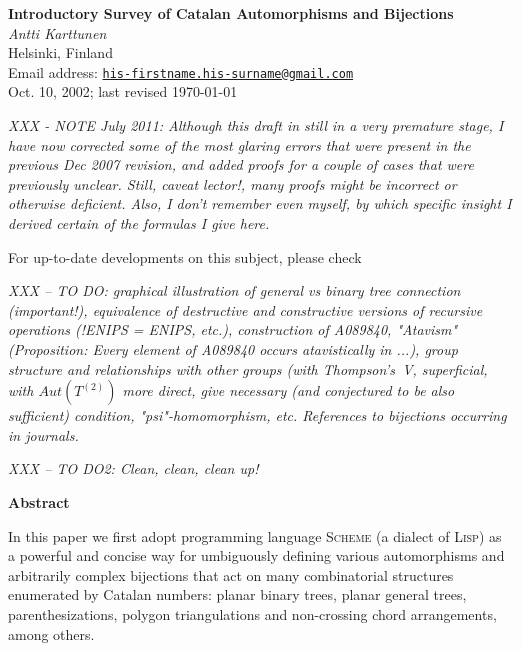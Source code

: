 \documentclass[11pt]{article} %
\newcommand{\proglangname}[1]{{\textsc{#1}}}
\begin{document}
\begin{center}
{\large\bf Introductory Survey of Catalan Automorphisms and Bijections} \\
\vspace*{+.2in}
{\em Antti Karttunen} \smallskip \\
Helsinki, Finland \\
Email address: \href{mailto:his-firstname.his-surname@gmail.com}{{\tt his-firstname.his-surname@gmail.com}}
\bigskip \\
Oct. 10, 2002; last revised \today \bigskip
\end{center}

{\em XXX - NOTE July 2011: Although this draft in still in a very premature stage,
I have now corrected some of the most glaring errors that were present
in the previous Dec 2007 revision,  and added proofs for a couple of
cases that were previously unclear.
Still, caveat lector!, many proofs might
be incorrect or otherwise deficient. Also, I don't remember even
myself, by which specific insight I derived certain of the formulas
I give here.

For up-to-date developments on this subject, please
check }

\emph{XXX -- TO DO: graphical illustration of general vs binary tree connection (important!), equivalence of destructive and constructive versions of recursive operations (!ENIPS = ENIPS, etc.), construction of A089840, "Atavism" (Proposition: Every element of A089840 occurs atavistically in ...), group structure and relationships with other groups (with Thompson's~V, superficial, with $Aut(T^{(2)})$ more direct, give necessary (and conjectured to be also sufficient) condition, "psi"-homomorphism, etc. References to bijections occurring in journals.}

\emph{XXX -- TO DO2: Clean, clean, clean up!}

\begin{center}
{\bf Abstract} \\
\end{center}
In this paper we first adopt programming language \proglangname{Scheme}
(a dialect of \proglangname{Lisp})
as a powerful and concise way for umbiguously defining %
various automorphisms and arbitrarily complex bijections
that act on many combinatorial structures
enumerated by Catalan numbers: planar binary trees, planar general trees,
parenthesizations, polygon triangulations and non-crossing
chord arrangements, among others.
\end{document}
